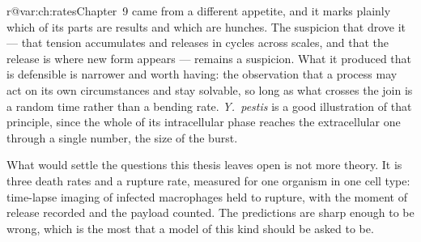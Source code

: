 \documentclass[11pt,a4paper]{report}
\makeatletter
\newcommand{\yp}{\textit{Y.~pestis}}
\providecommand{\Mextref}[2]{%
  \ifcsname r@#1\endcsname\Cref{#1}\else#2\fi}
\theoremstyle{plain}
\theoremstyle{remark}
\makeatother
\begin{document}
\Mextref{var:ch:rates}{Chapter~9} came from a different appetite, and it
marks plainly which of its parts are results and which are hunches. The
suspicion that drove it --- that tension accumulates and releases in cycles
across scales, and that the release is where new form appears --- remains a
suspicion. What it produced that is defensible is narrower and worth having:
the observation that a process may act on its own circumstances and stay
solvable, so long as what crosses the join is a random time rather than a
bending rate. \yp{} is a good illustration of that principle, since the whole
of its intracellular phase reaches the extracellular one through a single
number, the size of the burst.

What would settle the questions this thesis leaves open is not more theory.
It is three death rates and a rupture rate, measured for one organism in one
cell type: time-lapse imaging of infected macrophages held to rupture, with
the moment of release recorded and the payload counted. The predictions are
sharp enough to be wrong, which is the most that a model of this kind should
be asked to be.

\FloatBarrier
\begingroup
\footnotesize


\endgroup
\end{document}
